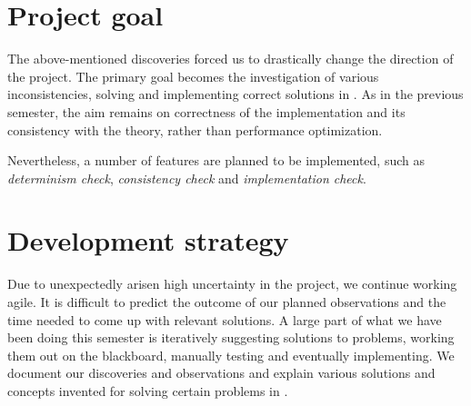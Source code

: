 \section{Project goal}
The above-mentioned discoveries forced us to drastically change the direction of the project. The primary goal becomes the investigation of various inconsistencies, solving and implementing correct solutions in \jecdar. As in the previous semester, the aim remains on correctness of the implementation and its consistency with the theory, rather than performance optimization.

Nevertheless, a number of features are planned to be implemented, such as \textit{determinism check}, \textit{consistency check} and \textit{implementation check}.

\section{Development strategy}
Due to unexpectedly arisen high uncertainty in the project, we continue working agile. It is difficult to predict the outcome of our planned observations and the time needed to come up with relevant solutions. A large part of what we have been doing this semester is iteratively suggesting solutions to problems, working them out on the blackboard, manually testing and eventually implementing. We document our discoveries and observations and explain various solutions and concepts invented for solving certain problems in \jecdar.